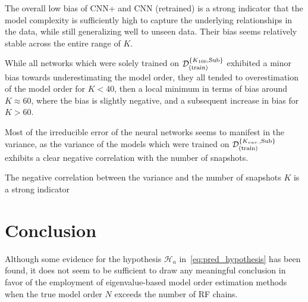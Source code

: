 The overall low bias of CNN+ and CNN (retrained) is a strong indicator that the model complexity is sufficiently high
to capture the underlying relationships in the data, while still generalizing well to unseen data. Their bias seems
relatively stable across the entire range of \( K \).

While all networks which were solely trained on \( \mathcal{D}^{\{K_{100},\text{Sub}\}}_{(\text{train})} \) exhibited a minor bias towards underestimating
the model order, they all tended to overestimation of the model order for \( K < 40 \), then a local minimum in terms
of bias around \( K \approx 60 \), where the bias is slightly negative, and a subsequent increase in bias for \( K > 60 \).

Most of the irreducible error of the neural networks seems to manifest in the variance, as the variance of the models which
were trained on \( \mathcal{D}^{\{K_{var.},\text{Sub}\}}_{(\text{train})} \) exhibits a clear negative correlation with the number of snapshots.

The negative correlation between the variance and the number of snapshots \( K \) is a strong indicator


\section{Conclusion}

Although some evidence for the hypothesis \( \mathcal{H}_a \) in~\autoref{eq:pred_hypothesis} has been found, it does not
seem to be sufficient to draw any meaningful conclusion in favor of the employment of eigenvalue-based model order estimation
methods when the true model order \( N \) exceeds the number of RF chains. \\
